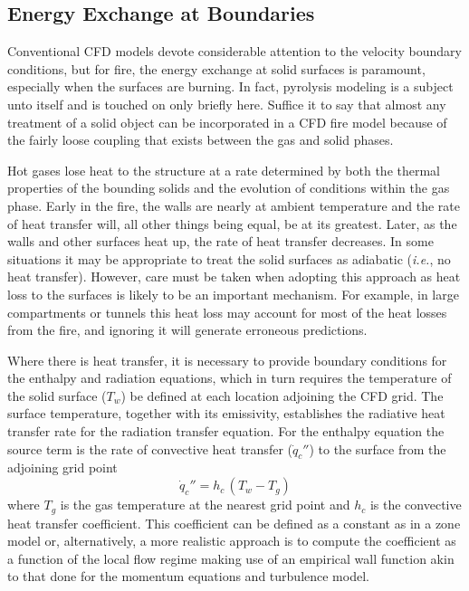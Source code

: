 \documentclass[graybox]{svmult}
\begin{document}
\subsection{Energy Exchange at Boundaries}

Conventional CFD models devote considerable attention to the velocity boundary conditions, but for fire, the energy exchange at solid surfaces is paramount, especially when the surfaces are burning. In fact, pyrolysis modeling is a subject unto itself and is touched on only briefly here. Suffice it to say that almost any treatment of a solid object can be incorporated in a CFD fire model because of the fairly loose coupling that exists between the gas and solid phases.

Hot gases lose heat to the structure at a rate determined by both the thermal properties of the bounding solids and the evolution of conditions within the gas phase. Early in the fire, the walls are nearly at ambient temperature and the rate of heat transfer will, all other things being equal, be at its greatest. Later, as the walls and other surfaces heat up, the rate of heat transfer decreases. In some situations it may be appropriate to treat the solid surfaces as adiabatic ({\em i.e.}, no heat transfer). However, care must be taken when adopting this approach as heat loss to the surfaces is likely to be an important mechanism. For example, in large compartments or tunnels this heat loss may account for most of the heat losses from the fire, and ignoring it will generate erroneous predictions.

Where there is heat transfer, it is necessary to provide boundary conditions for the enthalpy and radiation equations, which in turn requires the temperature of the solid surface ($T_w$) be defined at each location adjoining the CFD grid. The surface temperature, together with its emissivity, establishes the radiative heat transfer rate for the radiation transfer equation. For the enthalpy equation the source term is the rate of convective heat transfer ($\dot{q}_c''$) to the surface from the adjoining grid point
\begin{equation}
\dot{q}_c'' = h_c \, (T_w-T_g)
\label{eq:convection}
\end{equation}
where $T_g$ is the gas temperature at the nearest grid point and $h_c$ is the convective heat transfer coefficient. This coefficient can be defined as a constant as in a zone model or, alternatively, a more realistic approach is to compute the coefficient as a function of the local flow regime making use of an empirical wall function akin to that done for the momentum equations and turbulence model.
\end{document}

